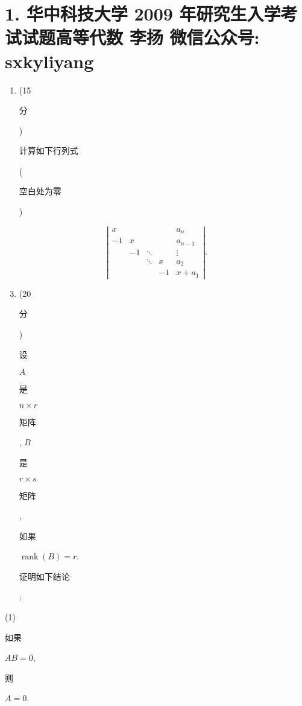 \documentclass[10pt]{article}
\begin{document}
\section{1. 华中科技大学 2009 年研究生入学考试试题高等代数 
 李扬 
 微信公众号: sxkyliyang}
\begin{enumerate}
  \item (15\begin{CJK}{UTF8}{mj}分\end{CJK}) \begin{CJK}{UTF8}{mj}计算如下行列式\end{CJK}(\begin{CJK}{UTF8}{mj}空白处为零\end{CJK})
\end{enumerate}
$$
\left|\begin{array}{ccccc}
x & & & & a_{n} \\
-1 & x & & & a_{n-1} \\
& -1 & \ddots & & \vdots \\
& & \ddots & x & a_{2} \\
& & & -1 & x+a_{1}
\end{array}\right| .
$$

\begin{enumerate}
  \setcounter{enumi}{2}
  \item (20\begin{CJK}{UTF8}{mj}分\end{CJK}) \begin{CJK}{UTF8}{mj}设\end{CJK} $A$ \begin{CJK}{UTF8}{mj}是\end{CJK} $n \times r$ \begin{CJK}{UTF8}{mj}矩阵\end{CJK}, $B$ \begin{CJK}{UTF8}{mj}是\end{CJK} $r \times s$ \begin{CJK}{UTF8}{mj}矩阵\end{CJK}, \begin{CJK}{UTF8}{mj}如果\end{CJK} $\operatorname{rank}(B)=r$. \begin{CJK}{UTF8}{mj}证明如下结论\end{CJK}:
\end{enumerate}
(1) \begin{CJK}{UTF8}{mj}如果\end{CJK} $A B=0$, \begin{CJK}{UTF8}{mj}则\end{CJK} $A=0$.
\end{document}
